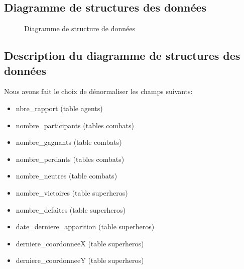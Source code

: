 \documentclass{article}[12pt]
\begin{document}
	\subsection{Diagramme de structures des données}
	\begin{figure}[H]
		\centering
		\caption{Diagramme de structure de données}
	\end{figure}
    \newpage
	\subsection{Description du diagramme de structures des données}
	\label{dsd}
	Nous avons fait le choix de dénormaliser les champs suivants: 
	\begin{itemize}
		\item nbre\_rapport (table agents)
		\item nombre\_participants (tables combats)
		\item nombre\_gagnants (table combats)
		\item nombre\_perdants (tables combats)
		\item nombre\_neutres (table combats)
		\item nombre\_victoires (table superheros)
		\item nombre\_defaites (table superheros)
		\item date\_derniere\_apparition (table superheros)
		\item derniere\_coordonneeX (table superheros) 	
		\item derniere\_coordonneeY (table superheros) 	
	\end{itemize}
\end{document}

